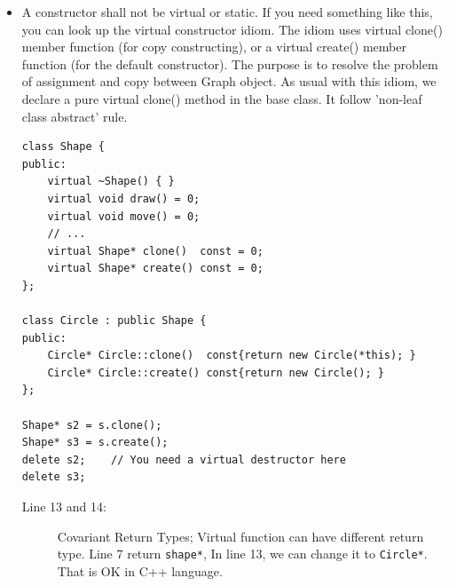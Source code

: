 \documentclass[a4paper,11pt,twoside]{book}
\begin{document}
\begin{itemize}
	\item A constructor shall not be virtual or static. If you need something like this, you can look up the virtual constructor idiom. The idiom uses virtual clone() member function (for copy constructing), or a virtual create() member function (for the default constructor). The purpose is to resolve the problem of assignment and copy between Graph object. As usual with this idiom, we declare a pure virtual clone() method in the base class. It follow 'non-leaf class abstract' rule.
	
\begin{lstlisting}
class Shape {
public:
	virtual ~Shape() { }                 
	virtual void draw() = 0;           
	virtual void move() = 0;
	// ...
	virtual Shape* clone()  const = 0;   
	virtual Shape* create() const = 0; 
};
	
class Circle : public Shape {
public:
	Circle* Circle::clone()  const{return new Circle(*this); }	
	Circle* Circle::create() const{return new Circle(); }  
};

Shape* s2 = s.clone();
Shape* s3 = s.create();
delete s2;    // You need a virtual destructor here
delete s3;
\end{lstlisting}
	\begin{description}
		\item[Line 13 and 14:] Covariant Return Types; Virtual function can have different return type. Line 7 return \texttt{shape*}, In line 13, we can change it to \texttt{Circle*}. That is OK in C++ language.
	\end{description}

\end{itemize}


	
\end{document}
